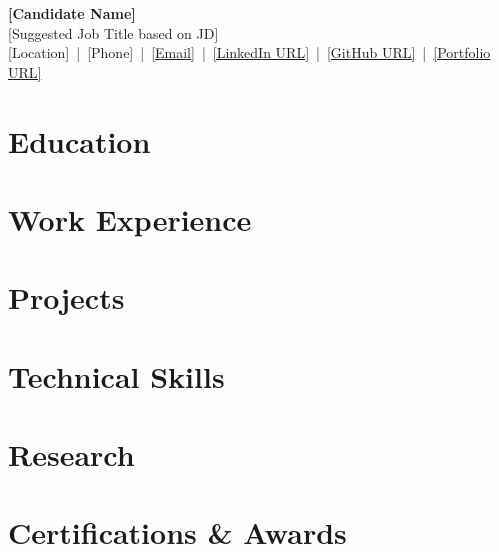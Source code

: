 \documentclass[letterpaper,11pt]{article}
\begin{document}
\begin{center}
    {\LARGE \textbf{[Candidate Name]}}\\
    {\normalsize [Suggested Job Title based on JD]}\\
    \small
    [Location] \,|\, [Phone] \,|\, \href{mailto:[Email]}{[Email]} \,|\, \href{https://[LinkedIn URL]}{[LinkedIn URL]} \,|\, \href{https://[GitHub URL]}{[GitHub URL]} \,|\, \href{https://[Portfolio URL]}{[Portfolio URL]}
\end{center}
\vspace{-13pt}


\section*{Education}

\section*{Work Experience}

\section*{Projects}

\section*{Technical Skills}

\section*{Research}

\section*{Certifications \& Awards}
\end{document}
